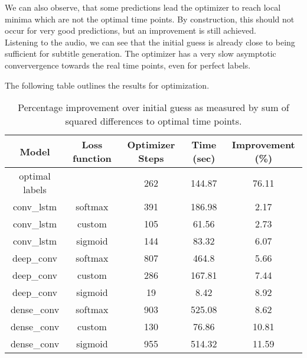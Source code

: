We can also observe, that some predictions lead the optimizer to reach local minima which are not the optimal time points. By construction, this should not occur for very good predictions, but an improvement is still achieved.\\
Listening to the audio, we can see that the initial guess is already close to being sufficient for subtitle generation. The optimizer has a very slow asymptotic conververgence towards the real time points, even for perfect labels.

The following table outlines the results for optimization.

\FloatBarrier
\begin{table}[ht]
	\centering
	\begin{tabular}{ccccc}
		\toprule
		Model & Loss function & Optimizer Steps & Time (sec) & Improvement (\%)\\
		\midrule
		optimal labels &  & 262 & 144.87 & 76.11 \\
		conv\_lstm  & softmax  & 391 & 186.98 & 2.17 \\
		conv\_lstm  & custom   & 105 & 61.56 & 2.73 \\
		conv\_lstm  & sigmoid  & 144 & 83.32 & 6.07 \\
		deep\_conv  & softmax  & 807 & 464.8 & 5.66 \\
		deep\_conv  & custom   & 286 & 167.81 & 7.44 \\
		deep\_conv  & sigmoid  & 19 & 8.42 & 8.92 \\
		dense\_conv & softmax  & 903 & 525.08 & 8.62 \\
		dense\_conv & custom   & 130 & 76.86 & 10.81 \\
		dense\_conv & sigmoid  & 955 & 514.32 & 11.59 \\
		\bottomrule
	\end{tabular}
	\caption{Percentage improvement over initial guess as measured by sum of squared differences to optimal time points.}
\end{table}
\FloatBarrier









